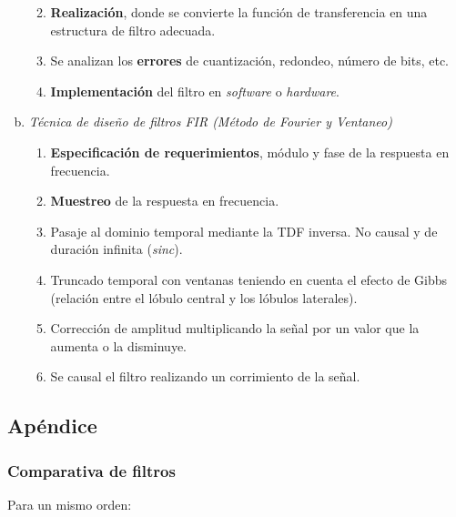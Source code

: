 \documentclass[a4paper,10pt,spanish,oneside]{article}
\begin{document}
\begin{enumerate}[a.]
\begin{enumerate}[1)]
\begin{itemize}
\end{itemize}

\item \textbf{Realización}, donde se convierte la función de transferencia en una estructura de filtro adecuada.

\item Se analizan los \textbf{errores} de cuantización, redondeo, número de bits, etc.

\item \textbf{Implementación} del filtro en \textit{software} o \textit{hardware}.

\end{enumerate}

\item \textit{Técnica de diseño de filtros FIR (Método de Fourier y Ventaneo)} 

\begin{enumerate}[1)]
\item \textbf{Especificación de requerimientos}, módulo y fase de la respuesta en frecuencia.

\item \textbf{Muestreo} de la respuesta en frecuencia.

\item Pasaje al dominio temporal mediante la TDF inversa. No causal y de duración infinita (\textit{sinc}).

\item Truncado temporal con ventanas teniendo en cuenta el efecto de Gibbs (relación entre el lóbulo central y los lóbulos laterales).

\item Corrección de amplitud multiplicando la señal por un valor que la aumenta o la disminuye.

\item Se causal el filtro realizando un corrimiento de la señal.
\end{enumerate} 

\end{enumerate}

\subsection{Apéndice}

\subsubsection{Comparativa de filtros}

Para un mismo orden:\\
\end{document}
